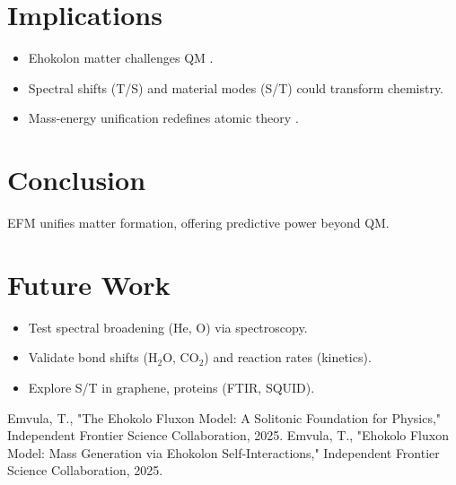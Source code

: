 \documentclass{article}
\begin{document}
\section{Implications}
\begin{itemize}
    \item Ehokolon matter challenges QM \cite{emvula2025mass}.
    \item Spectral shifts (T/S) and material modes (S/T) could transform chemistry.
    \item Mass-energy unification redefines atomic theory \cite{emvula2025foundation}.
\end{itemize}

\section{Conclusion}
EFM unifies matter formation, offering predictive power beyond QM.

\section{Future Work}
\begin{itemize}
    \item Test spectral broadening (He, O) via spectroscopy.
    \item Validate bond shifts (H$_2$O, CO$_2$) and reaction rates (kinetics).
    \item Explore S/T in graphene, proteins (FTIR, SQUID).
\end{itemize}

\begin{thebibliography}{2}
 Emvula, T., "The Ehokolo Fluxon Model: A Solitonic Foundation for Physics," Independent Frontier Science Collaboration, 2025.
 Emvula, T., "Ehokolo Fluxon Model: Mass Generation via Ehokolon Self-Interactions," Independent Frontier Science Collaboration, 2025.
\end{thebibliography}
\end{document}
